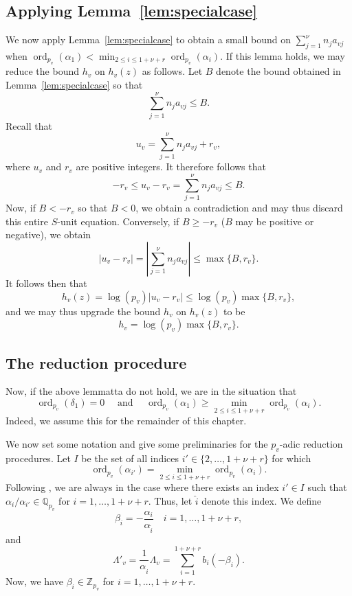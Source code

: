 \documentclass[11pt]{report}
\theoremstyle{definition}
\DeclareMathOperator{\ord}{ord}
\begin{document}
\subsection{Applying Lemma~\ref{lem:specialcase}}
\label{sec:apply-lemma-refl}

We now apply Lemma~\ref{lem:specialcase} to obtain a small bound on $\sum_{j = 1}^{\nu} n_ja_{vj}$ when ${\ord_{p_v}(\alpha_1) < \displaystyle \min_{2 \leq i \leq 1+\nu+r} \ord_{p_v}(\alpha_i)}$. If this lemma holds, we may reduce the bound $h_v$ on $h_v(z)$ as follows. Let $B$ denote the bound obtained in Lemma~\ref{lem:specialcase} so that
\[\sum_{j = 1}^{\nu} n_ja_{vj} \leq B.\]
Recall that
\[ u_v = \sum_{j = 1}^{\nu} n_ja_{vj} + r_v,\]
where $u_v$ and $r_v$ are positive integers. It therefore follows that
\[ -r_v \leq u_v - r_v = \sum_{j = 1}^{\nu} n_ja_{vj} \leq B.\]
Now, if $B < - r_v$ so that $B < 0$, we obtain a contradiction and may thus discard this entire $S$-unit equation. Conversely, if $B \geq -r_v$ ($B$ may be positive or negative), we obtain
\[|u_v - r_v| = \left| \sum_{j = 1}^{\nu} n_ja_{vj} \right| \leq \max\{B,r_v\}.\]
It follows then that
\[h_v(z) = \log(p_v)|u_v - r_v| \leq \log(p_v)\max\{B,r_v\},\]
and we may thus upgrade the bound $h_v$ on $h_v(z)$ to be
\[h_v = \log(p_v)\max\{B,r_v\}.\]


\subsection{The reduction procedure}
\label{sec:reduction-procedure}

Now, if the above lemmatta do not hold, we are in the situation that
\[\ord_{p_v}(\delta_1) = 0 \quad \text{ and } \quad \ord_{p_v}(\alpha_1) \geq
  \displaystyle \min_{2 \leq i \leq 1+\nu+r} \ord_{p_v}(\alpha_i).\]
Indeed, we assume this for the remainder of this chapter.

We now set some notation and give some preliminaries for the $p_v$-adic reduction procedures. Let $I$ be the set of all indices $i' \in \{2, \dots, 1+ \nu + r\}$ for which
\[\ord_{p_v}(\alpha_{i'}) = \min_{2\leq i\leq 1+ \nu+ r} \ord_{p_v}(\alpha_i).\]
Following \cite{Ham}, we are always in the case where there exists an index $i' \in I$ such that $\alpha_i/\alpha_{i'} \in \mathbb{Q}_{p_v}$ for $i = 1, \dots, 1+ \nu+ r$. Thus, let $\hat{i}$ denote this index. We define
\[\beta_i = - \frac{\alpha_i}{\alpha_{\hat{i}}} \quad i = 1, \dots, 1+ \nu+ r,\]
and
\[\Lambda'_v = \frac{1}{\alpha_{\hat{i}}}\Lambda_v = \sum_{i = 1}^{1+ \nu+ r} b_i(-\beta_i).\]
Now, we have $\beta_i \in \mathbb{Z}_{p_v}$ for $i = 1, \dots, 1+ \nu+ r$.
\end{document}
